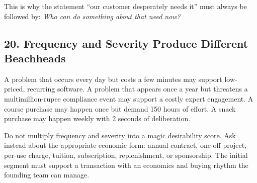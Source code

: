 This is why the statement ``our customer desperately needs it'' must always be followed by: \emph{Who can do something about that need now?}

\subsection*{20. Frequency and Severity Produce Different Beachheads}

A problem that occurs every day but costs a few minutes may support low-priced, recurring software. A problem that appears once a year but threatens a multimillion-rupee compliance event may support a costly expert engagement. A course purchase may happen once but demand 150 hours of effort. A snack purchase may happen weekly with 2 seconds of deliberation.

Do not multiply frequency and severity into a magic desirability score. Ask instead about the appropriate economic form: annual contract, one-off project, per-use charge, tuition, subscription, replenishment, or sponsorship. The initial segment must support a transaction with an economics and buying rhythm the founding team can manage.
